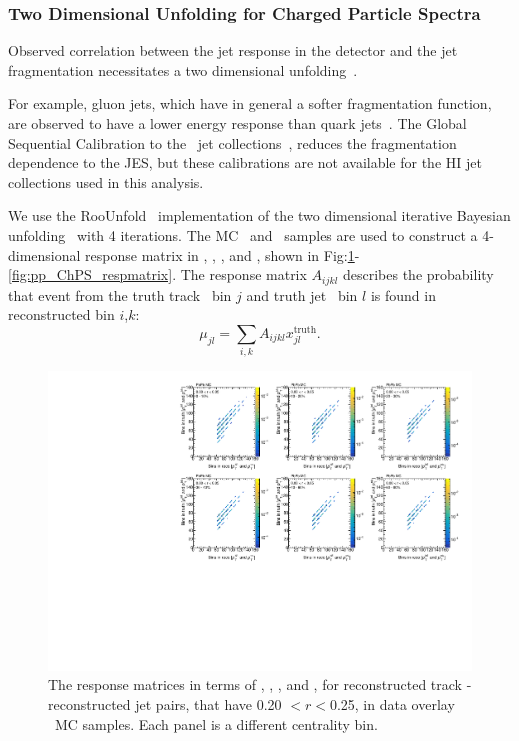 \subsubsection{Two Dimensional Unfolding for Charged Particle Spectra}
\label{sec:2dunfolding}


Observed correlation between the jet response in the detector and the jet fragmentation necessitates a two dimensional unfolding~\cite{PhysRevC.98.024908}.

For example, gluon jets, which have in general a softer fragmentation function, are observed to have a lower energy response than quark jets~\cite{Aad:2014bia}.
 The Global Sequential Calibration to the \pp\ jet collections~\cite{ATLAS:2015oia}, reduces the fragmentation dependence to the JES, but these calibrations are not available for the HI jet collections used in this analysis.

We use the RooUnfold~\cite{Adye:2011gm} implementation of the two dimensional iterative Bayesian unfolding~\cite{D'Agostini:1994zf} with 4 iterations.
The MC \pbpb\ and \pp\ samples are used to construct a 4-dimensional response matrix in \pttrktruth, \ptjettruth, \pttrkreco, and \ptjetreco, shown in Fig:\ref{fig:PbPb_ChPS_respmatrix}-\ref{fig:pp_ChPS_respmatrix}.
The response matrix $A_{ijkl}$ describes the probability that event from the truth track \pt\  bin $j$ and truth jet \pT\ bin $l$ is found in reconstructed bin $i$,$k$:
\begin{equation}
\mu_{jl} = \sum_{i,k} A_{ijkl}x^{\text{truth}}_{jl}.
\end{equation} 


\begin{figure}[ht]
\centering
\includegraphics[page=5, width=1.0\textwidth]{figures/main/corrections/resp_matrix_ChPS_PbPb_MC.pdf}
\caption{The response matrices in terms of \ptjetreco, \ptjettruth, \pttrkreco, and \pttrktruth, for reconstructed track - reconstructed jet pairs, that have 0.20 $< r < $0.25, in data overlay \pbpb\ MC samples.
Each panel is a different centrality bin.}
\label{fig:PbPb_ChPS_respmatrix}
\end{figure}

